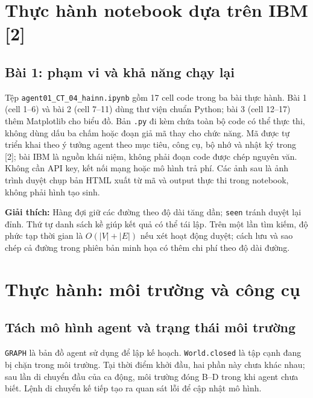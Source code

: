 \documentclass[12pt,a4paper]{article}
\begin{document}


\clearpage
\section{Thực hành notebook dựa trên IBM [2]}
\subsection{Bài 1: phạm vi và khả năng chạy lại}
Tệp \texttt{agent01\_CT\_04\_hainn.ipynb} gồm 17 cell code trong ba bài thực hành.
Bài 1 (cell 1--6) và bài 2 (cell 7--11) dùng thư viện chuẩn Python; bài 3
(cell 12--17) thêm Matplotlib cho biểu đồ. Bản \texttt{.py} đi kèm chứa toàn bộ code
có thể thực thi, không dùng dấu ba chấm hoặc đoạn giả mã thay cho chức năng.
Mã được tự triển khai theo ý tưởng agent theo mục tiêu, công cụ, bộ nhớ và nhật ký trong
[2]; bài IBM là nguồn khái niệm, không phải đoạn code được chép nguyên văn.
Không cần API key, kết nối mạng hoặc mô hình trả phí. Các ảnh sau là ảnh trình duyệt
chụp bản HTML xuất từ mã và output thực thi trong notebook, không phải hình tạo sinh.

\noindent\textbf{Giải thích:} Hàng đợi giữ các đường theo độ dài tăng dần; \texttt{seen}
tránh duyệt lại đỉnh. Thứ tự danh sách kề giúp kết quả có thể tái lập. Trên một lần tìm
kiếm, độ phức tạp thời gian là $O(|V|+|E|)$ nếu xét hoạt động duyệt; cách lưu và sao chép
cả đường trong phiên bản minh họa có thêm chi phí theo độ dài đường.

\newpage
\section*{Thực hành: môi trường và công cụ}

\subsection{Tách mô hình agent và trạng thái môi trường}
\texttt{GRAPH} là bản đồ agent sử dụng để lập kế hoạch. \texttt{World.closed} là tập cạnh
đang bị chặn trong môi trường. Tại thời điểm khởi đầu, hai phần này chưa khác nhau;
sau lần di chuyển đầu của ca động, môi trường đóng B--D trong khi agent chưa biết.
Lệnh di chuyển kế tiếp tạo ra quan sát lỗi để cập nhật mô hình.
\end{document}
